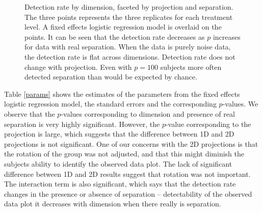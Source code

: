 \begin{figure}[ht]
   \centering
      \caption{Detection rate by dimension, faceted by projection and separation. The three points represents the three replicates for each treatment level. A fixed effects logistic regression model is overlaid on the points. It can be seen that the detection rate decreases as $p$ increases for data with real separation. When the data is purely noise data, the detection rate is flat across dimensions. Detection rate does not change with projection.  Even with $p = 100$ subjects more often detected separation than would be expected by chance. }
       \label{suc-rate-glm}
\end{figure}

Table \ref{params} shows the estimates of the parameters from the fixed effects logistic regression model, the standard errors and the corresponding $p$-values. We observe that the $p$-values corresponding to dimension and presence of real separation is very highly significant. However, the $p$-value corresponding to the projection is large, which suggests that the difference between 1D and 2D projections is not significant. One of our concerns with the 2D projections is that the rotation of the group was not adjusted, and that this might diminish the subjects ability to identify the observed data plot. The lack of significant difference between 1D and 2D results suggest that rotation was not important. The interaction term is also significant, which says that the detection rate changes in the presence or absence of separation -- detectability of the observed data plot it decreases with dimension when there really is separation.

